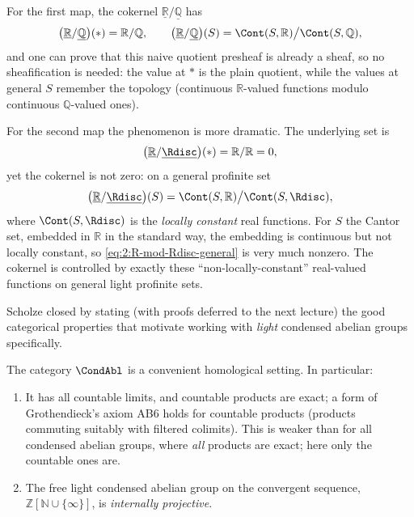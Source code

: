 \begin{example}
\label{ex:2:cokernels}
For the first map, the cokernel $\underline{\mathbb{R}}/\underline{\mathbb{Q}}$
has
\begin{equation*}
\bigl(\underline{\mathbb{R}}/\underline{\mathbb{Q}}\bigr)(\ast)=\mathbb{R}/\mathbb{Q},
\qquad
\bigl(\underline{\mathbb{R}}/\underline{\mathbb{Q}}\bigr)(S)
=\Cont(S,\mathbb{R})\big/\Cont(S,\mathbb{Q}),
\end{equation*}
and one can prove that this naive quotient presheaf is already a sheaf, so no
sheafification is needed: the value at $\ast$ is the plain quotient, while the
values at general $S$ remember the topology (continuous $\mathbb{R}$-valued
functions modulo continuous $\mathbb{Q}$-valued ones).

For the second map the phenomenon is more dramatic. The underlying set is
\begin{equation*}
\bigl(\underline{\mathbb{R}}/\underline{\Rdisc}\bigr)(\ast)=\mathbb{R}/\mathbb{R}=0,
\end{equation*}
yet the cokernel is not zero: on a general profinite set
\begin{equation}
\label{eq:2:R-mod-Rdisc-general}
\bigl(\underline{\mathbb{R}}/\underline{\Rdisc}\bigr)(S)
=\Cont(S,\mathbb{R})\big/\Cont(S,\Rdisc),
\end{equation}
where $\Cont(S,\Rdisc)$ is the \emph{locally constant} real functions. For $S$
the Cantor set, embedded in $\mathbb{R}$ in the standard way, the embedding is
continuous but not locally constant, so \eqref{eq:2:R-mod-Rdisc-general} is very
much nonzero. The cokernel is controlled by exactly these ``non-locally-constant''
real-valued functions on general light profinite sets.
\end{example}

Scholze closed by stating (with proofs deferred to the next lecture) the good
categorical properties that motivate working with \emph{light} condensed abelian
groups specifically.

\begin{theorem}
\label{thm:2:condab-properties}
The category $\CondAbl$ is a convenient homological setting. In particular:
\begin{enumerate}
\item It has all countable limits, and countable products are exact; a form of
Grothendieck's axiom \textup{AB6} holds for countable products (products
commuting suitably with filtered colimits). This is weaker than for all condensed
abelian groups, where \emph{all} products are exact; here only the countable ones
are.
\item The free light condensed abelian group on the convergent sequence,
$\mathbb{Z}[\mathbb{N}\cup\{\infty\}]$, is \emph{internally projective}.
\end{enumerate}
\end{theorem}

